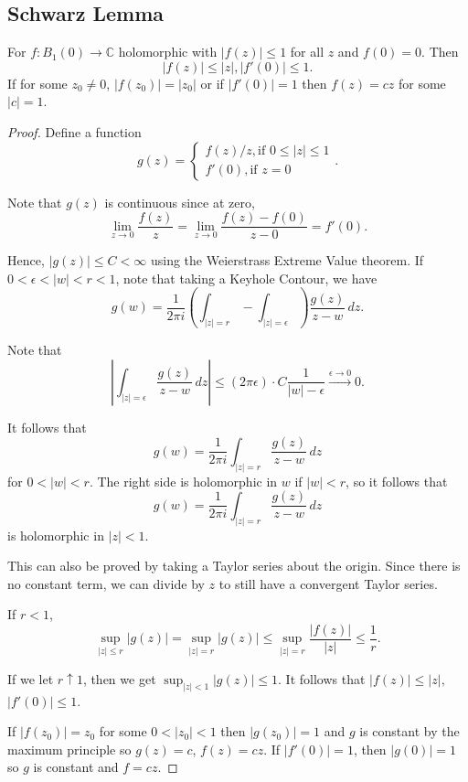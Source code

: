 \documentclass[12pt]{scrartcl}
\newcommand{\C}{\mathbb C}
\begin{document}
\subsection{Schwarz Lemma}
 \begin{thm} For $f: B_1(0) \to \C$ holomorphic with $|f(z)|\le 1$ for all $z$ and $f(0) = 0$.  Then
 $$|f(z)| \le |z|, |f'(0)| \le 1.$$
 If for some $z_0 \ne 0$, $|f(z_0)| = |z_0|$ or if $|f'(0)| = 1$ then $f(z) = cz$ for some $|c| = 1$.
 \end{thm}
 \begin{proof}
 Define a function
 $$g(z) = \begin{cases} f(z)/z, \text{if } 0 \le |z| \le 1 \\
 f'(0), \text{if } z = 0
 \end{cases}.$$
 
 Note that $g(z)$ is continuous since at zero,
 $$\lim_{z \to 0} \frac{f(z)}{z} = \lim_{z \to 0} \frac{f(z) - f(0)}{z - 0} = f'(0).$$
 
 Hence, $|g(z)| \le C < \infty$ using the Weierstrass Extreme Value theorem.    If $0 < \epsilon < |w| < r < 1$, note that taking a Keyhole Contour, we have
 $$g(w) = \frac{1}{2\pi i} \left (\int_{|z| = r} - \int_{|z| = \epsilon}\right ) \frac{g(z)}{z - w}\,dz.$$
 
Note that
 $$\left |\int_{|z| = \epsilon} \frac{g(z)}{z-w}\,dz\right | \le (2 \pi \epsilon) \cdot C \frac{1}{|w| - \epsilon} \xrightarrow{\epsilon \to 0} 0.$$
 
 It follows that $$g(w) = \frac{1}{2\pi i} \int_{|z| = r} \frac{g(z)}{z - w}\, dz$$
 for $0 < |w| < r$.  The right side is holomorphic in $w$ if $|w| < r$, so it follows that 
 $$g(w) = \frac{1}{2\pi i} \int_{|z| = r} \frac{g(z)}{z - w}\, dz$$
 is holomorphic in $|z| < 1$.  
 
 This can also be proved by taking a Taylor series about the origin.  Since there is no constant term, we can divide by $z$ to still have a convergent Taylor series.  
 
 If $r < 1$,
 $$\sup_{|z| \le r} |g(z)| = \sup_{|z| = r} |g(z)| \le \sup_{|z| = r} \frac{|f(z)|}{|z|} \le \frac{1}{r}.$$
 
 If we let $r \uparrow 1$, then we get $\sup_{|z| < 1} |g(z) |\le 1$.  It follows that $|f(z)| \le |z|,$ $|f'(0)| \le 1$.
 
 If $|f(z_0)| = z_0$ for some $0 < |z_0| < 1$ then $|g(z_0)| = 1$ and $g$ is constant by the maximum principle so $g(z) = c$, $f(z) = cz$.  If $|f'(0)| = 1$, then $|g(0)| = 1$ so $g$ is constant and $f = cz$.
 \end{proof}
\end{document}
